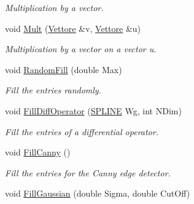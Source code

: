 \begin{DoxyCompactItemize}
\begin{DoxyCompactList}\small\item\em Multiplication by a vector. \end{DoxyCompactList}\item 
void \hyperlink{classMatrice_a97ad116b8ad02f27c746c17b3bcce612}{Mult} (\hyperlink{classVettore}{Vettore} \&v, \hyperlink{classVettore}{Vettore} \&u)\hypertarget{classMatrice_a97ad116b8ad02f27c746c17b3bcce612}{}\label{classMatrice_a97ad116b8ad02f27c746c17b3bcce612}

\begin{DoxyCompactList}\small\item\em Multiplication by a vector on a vector u. \end{DoxyCompactList}\item 
void \hyperlink{classMatrice_af5aec4d0a8386473246317d8f80393b5}{Random\+Fill} (double Max)\hypertarget{classMatrice_af5aec4d0a8386473246317d8f80393b5}{}\label{classMatrice_af5aec4d0a8386473246317d8f80393b5}

\begin{DoxyCompactList}\small\item\em Fill the entries randomly. \end{DoxyCompactList}\item 
void \hyperlink{classMatrice_a7c602135948f6cf92eb09ad149cf9e5d}{Fill\+Diff\+Operator} (\hyperlink{structSPLINE}{S\+P\+L\+I\+NE} Wg, int N\+Dim)\hypertarget{classMatrice_a7c602135948f6cf92eb09ad149cf9e5d}{}\label{classMatrice_a7c602135948f6cf92eb09ad149cf9e5d}

\begin{DoxyCompactList}\small\item\em Fill the entries of a differential operator. \end{DoxyCompactList}\item 
void \hyperlink{classMatrice_a3d2595adaba8bd47736da2b21bd2fd77}{Fill\+Canny} ()\hypertarget{classMatrice_a3d2595adaba8bd47736da2b21bd2fd77}{}\label{classMatrice_a3d2595adaba8bd47736da2b21bd2fd77}

\begin{DoxyCompactList}\small\item\em Fill the entries for the Canny edge detector. \end{DoxyCompactList}\item 
void \hyperlink{classMatrice_a5ceb29f59f80d11657e7d9cb7ab442d0}{Fill\+Gaussian} (double Sigma, double Cut\+Off)\hypertarget{classMatrice_a5ceb29f59f80d11657e7d9cb7ab442d0}{}\label{classMatrice_a5ceb29f59f80d11657e7d9cb7ab442d0}


\end{DoxyCompactItemize}
